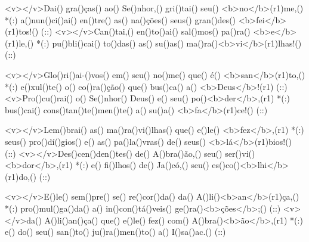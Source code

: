 <v></v>Dai() gra()ças() ao() Se()nhor,() gri()tai() seu() <b>no</b>(r1)me,() *(:)
a()nun()ci()ai() en()tre() as() na()ções() seus() gran()des() <b>fei</b>(r1)tos!() (::)
<v></v>Can()tai,() en()to()ai() sal()mos() pa()ra() <b>e</b>(r1)le,() *(:)
pu()bli()cai() to()das() as() su()as() ma()ra()<b>vi</b>(r1)lhas!() (::)

<v></v>Glo()ri()ai-()vos() em() seu() no()me() que() é() <b>san</b>(r1)to,() *(:)
e()xul()te() o() co()ra()ção() que() bus()ca() a() <b>Deus</b>!(r1) (::)
<v>Pro()cu()rai() o() Se()nhor() Deus() e() seu() po()<b>der</b>,(r1) *(:)
bus()cai() cons()tan()te()men()te() a() su()a() <b>fa</b>(r1)ce!() (::)

<v></v>Lem()brai() as() ma()ra()vi()lhas() que() e()le() <b>fez</b>,(r1) *(:)
seus() pro()dí()gios() e() as() pa()la()vras() de() seus() <b>lá</b>(r1)bios!() (::)
<v></v>Des()cen()den()tes() de() A()bra()ão,() seu() ser()vi()<b>dor</b>,(r1) *(:)
e() fi()lhos() de() Ja()có,() seu() es()co()<b>lhi</b>(r1)do,() (::)

<v></v>E()le() sem()pre() se() re()cor()da() da() A()li()<b>an</b>(r1)ça,() *(:)
pro()mul()ga()da() a() in()con()tá()veis() ge()ra()<b>ções</b>;() (::)
<v></v>da() A()li()an()ça() que() e()le() fez() com() A()bra()<b>ão</b>,(r1) *(:)
e() do() seu() san()to() ju()ra()men()to() a() I()sa()ac.() (::)